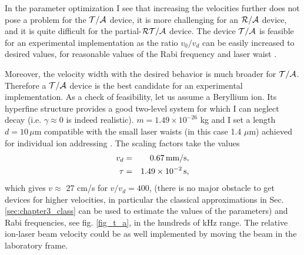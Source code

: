 In the parameter optimization I see that increasing the velocities further does not pose a problem for the ${\cal T/A}$
device, it is more challenging for an ${\cal R/A}$ device, and it is quite difficult for the partial-${\cal RT/A}$ device.  The device ${\cal T/A}$ is feasible for an experimental implementation  as the ratio $v_0/v_d$ can be easily increased to desired values, for  reasonable values of the
Rabi frequency and laser waist \cite{Zeyen2016}.

Moreover, the velocity width with the desired behavior is much broader for ${\cal T/A}$. Therefore a ${\cal T/A}$
device is the best candidate for
an experimental implementation.
As a check of feasibility, let us assume a Beryllium ion. Its hyperfine structure provides a good  two-level system
for which I can neglect decay (i.e. $\gamma\approx 0$ is indeed realistic). $m=1.49\times 10^{-26}$ kg
and I set a length $d=10\, \mu$m compatible with the small laser waists (in this case 1.4 $\mu$m) achieved for individual ion
addressing \cite{Zeyen2016}. The scaling factors take the values
%
\begin{eqnarray}
  v_d&=&0.67\, {\rm mm/s},
  \nonumber\\
  \tau&=&1.49\times 10^{-2}\, {\rm s},
  \nonumber
\end{eqnarray}
%
which gives  $v\approx$ 27 cm/s for $v/v_d=400$, (there is no major obstacle to get devices for higher velocities,
in particular the classical approximations in Sec. \ref{sec:chapter3_class} can be used to  estimate the values of the parameters)
and Rabi frequencies, see fig. \ref{fig_t_a},  in the hundreds of kHz range. The relative ion-laser beam velocity could be as well
implemented  by moving the beam in the laboratory frame.

%
%
